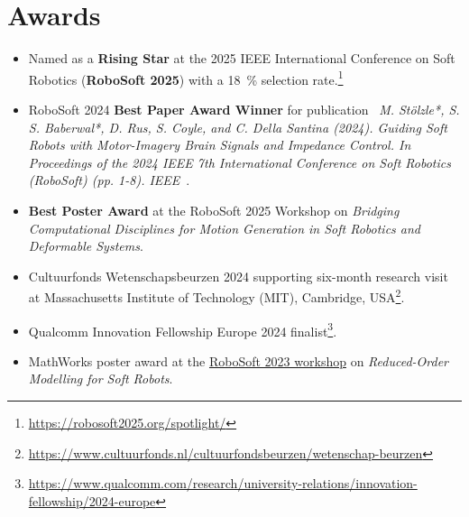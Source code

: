 \section*{Awards}
\begin{itemize}
    \item[\faTrophy] Named as a \textbf{Rising Star} at the 2025 IEEE International Conference on Soft Robotics (\textbf{RoboSoft 2025}) with a \SI{18}{\percent} selection rate.\footnote{\url{https://robosoft2025.org/spotlight/}}
    \item[\faTrophy] RoboSoft 2024 \textbf{Best Paper Award Winner} for publication \faFileTextO \ \emph{M. Stölzle*, S. S. Baberwal*, D. Rus, S. Coyle, and C. Della Santina (2024). Guiding Soft Robots with Motor-Imagery Brain Signals and Impedance Control. In Proceedings of the 2024 IEEE 7th International Conference on Soft Robotics (RoboSoft) (pp. 1-8). IEEE}~\citep{stolzle2024guiding}.
    \item[\faTrophy] \textbf{Best Poster Award} at the RoboSoft 2025 Workshop on \emph{Bridging Computational Disciplines for Motion Generation in Soft Robotics and Deformable Systems}.
    \item[\faTrophy] Cultuurfonds Wetenschapsbeurzen 2024 supporting six-month research visit at Massachusetts Institute of Technology (MIT), Cambridge, USA\footnote{\url{https://www.cultuurfonds.nl/cultuurfondsbeurzen/wetenschap-beurzen}}.
    \item[\faTrophy] Qualcomm Innovation Fellowship Europe 2024 finalist\footnote{\url{https://www.qualcomm.com/research/university-relations/innovation-fellowship/2024-europe}}.
    \item[\faTrophy] MathWorks poster award at the \href{https://sites.google.com/view/robosoft2023-workshop-rom/home}{RoboSoft 2023 workshop} on \emph{Reduced-Order Modelling for Soft Robots}.
\end{itemize}

